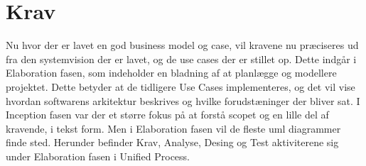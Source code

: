 \chapter{Krav}\label{ch:krav}


Nu hvor der er lavet en god business model og case, vil kravene nu præciseres ud fra den systemvision der er lavet, og de use cases der er stillet op. Dette indgår i Elaboration fasen, som indeholder en bladning af at planlægge og modellere projektet. Dette betyder at de tidligere Use Cases implementeres, og det vil vise hvordan softwarens arkitektur beskrives og hvilke forudstæninger der bliver sat. I Inception fasen var der et større fokus på at forstå scopet og en lille del af kravende, i tekst form. Men i Elaboration fasen vil de fleste uml diagrammer finde sted\cite{Larman2004}. Herunder befinder Krav, Analyse, Desing og Test aktiviterene sig under Elaboration fasen i Unified Process\cite{UnifiedProcess}. 



 